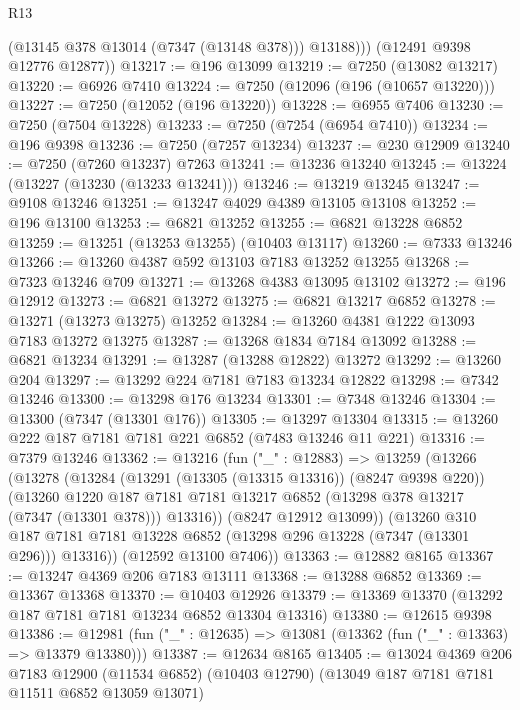\begin{lexlean}{R13}
\begin{coremodule}
            (@13145 @378 @13014 (@7347 (@13148 @378)))
            @13188)))
      (@12491 @9398 @12776 @12877))
@13217 := @196 @13099
@13219 := @7250 (@13082 @13217)
@13220 := @6926 @7410
@13224 := @7250 (@12096 (@196 (@10657 @13220)))
@13227 := @7250 (@12052 (@196 @13220))
@13228 := @6955 @7406
@13230 := @7250 (@7504 @13228)
@13233 := @7250 (@7254 (@6954 @7410))
@13234 := @196 @9398
@13236 := @7250 (@7257 @13234)
@13237 := @230 @12909
@13240 := @7250 (@7260 @13237) @7263
@13241 := @13236 @13240
@13245 := @13224 (@13227 (@13230 (@13233 @13241)))
@13246 := @13219 @13245
@13247 := @9108 @13246
@13251 := @13247 @4029 @4389 @13105 @13108
@13252 := @196 @13100
@13253 := @6821 @13252
@13255 := @6821 @13228 @6852
@13259 := @13251 (@13253 @13255) (@10403 @13117)
@13260 := @7333 @13246
@13266 := @13260 @4387 @592 @13103 @7183 @13252 @13255
@13268 := @7323 @13246 @709
@13271 := @13268 @4383 @13095 @13102
@13272 := @196 @12912
@13273 := @6821 @13272
@13275 := @6821 @13217 @6852
@13278 := @13271 (@13273 @13275) @13252
@13284 := @13260 @4381 @1222 @13093 @7183 @13272 @13275
@13287 := @13268 @1834 @7184 @13092
@13288 := @6821 @13234
@13291 := @13287 (@13288 @12822) @13272
@13292 := @13260 @204
@13297 := @13292 @224 @7181 @7183 @13234 @12822
@13298 := @7342 @13246
@13300 := @13298 @176 @13234
@13301 := @7348 @13246
@13304 := @13300 (@7347 (@13301 @176))
@13305 := @13297 @13304
@13315 := @13260 @222 @187 @7181 @7181 @221 @6852 (@7483 @13246 @11 @221)
@13316 := @7379 @13246
@13362 := @13216
    (fun ("_" : @12883) =>
    @13259
      (@13266
        (@13278
          (@13284
            (@13291 (@13305 (@13315 @13316)) (@8247 @9398 @220))
            (@13260
              @1220
              @187
              @7181
              @7181
              @13217
              @6852
              (@13298 @378 @13217 (@7347 (@13301 @378)))
              @13316))
          (@8247 @12912 @13099))
        (@13260
          @310
          @187
          @7181
          @7181
          @13228
          @6852
          (@13298 @296 @13228 (@7347 (@13301 @296)))
          @13316))
      (@12592 @13100 @7406))
@13363 := @12882 @8165
@13367 := @13247 @4369 @206 @7183 @13111
@13368 := @13288 @6852
@13369 := @13367 @13368
@13370 := @10403 @12926
@13379 := @13369 @13370 (@13292 @187 @7181 @7181 @13234 @6852 @13304 @13316)
@13380 := @12615 @9398
@13386 := @12981 (fun ("_" : @12635) => @13081 (@13362 (fun ("_" : @13363) => @13379 @13380)))
@13387 := @12634 @8165
@13405 := @13024
    @4369
    @206
    @7183
    @12900
    (@11534 @6852)
    (@10403 @12790)
    (@13049 @187 @7181 @7181 @11511 @6852 @13059 @13071)

\end{coremodule}
\end{lexlean}
